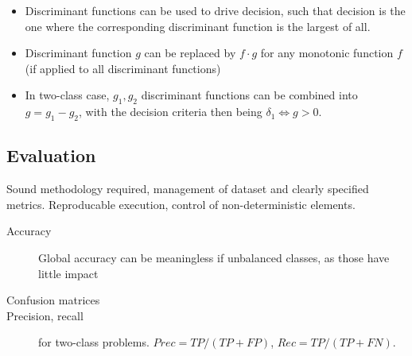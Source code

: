 \begin{itemize}
		\item Discriminant functions can be used to drive decision, such that
				decision is the one where the corresponding discriminant
				function is the largest of all.
		\item Discriminant function $g$ can be replaced by $f \cdot g$ for any
				monotonic function $f$ (if applied to all discriminant
				functions)
		\item In two-class case, $g_1, g_2$ discriminant functions can be
				combined into $g = g_1 - g_2$, with the decision criteria then
				being $\delta_1 \Leftrightarrow g > 0$.
\end{itemize}

\subsection{Evaluation}

Sound methodology required, management of dataset and clearly specified
metrics. Reproducable execution, control of non-deterministic elements.

\begin{description}
		\item[Accuracy] Global accuracy can be meaningless if unbalanced
				classes, as those have little impact
		\item[Confusion matrices]
		\item[Precision, recall] for two-class problems. $Prec = TP / (TP +
				FP)$, $Rec = TP / (TP + FN)$.
\end{description}
